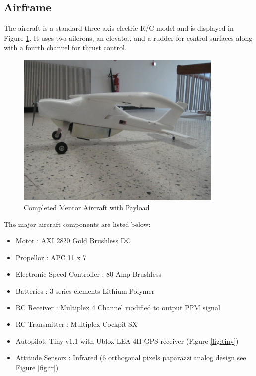 \documentclass[a4paper,11pt]{report}
\begin{document}
\subsection{Airframe}

The aircraft is a standard three-axis electric R/C model and is displayed in Figure \ref{fig:mentor}. It uses two ailerons, an elevator, and a rudder for control surfaces along with a fourth channel for thrust control.

\begin{figure}[ht]
 \centering
 \includegraphics[width=10cm]{800px-Mentor1_2.jpg}
 \caption{Completed Mentor Aircraft with Payload}
 \label{fig:mentor}
\end{figure}

The major aircraft components are listed below:

\begin{itemize}
 \item Motor : AXI 2820 Gold Brushless DC
 \item Propellor : APC 11 x 7 
 \item Electronic Speed Controller : 80 Amp Brushless
 \item Batteries : 3 series elements Lithium Polymer
 \item RC Receiver : Multiplex 4 Channel modified to output PPM signal
 \item RC Transmitter : Multiplex Cockpit SX
 \item Autopilot: Tiny v1.1 with Ublox LEA-4H GPS receiver (Figure \ref{fig:tiny})
 \item Attitude Sensors : Infrared (6 orthogonal pixels paparazzi analog design see Figure \ref{fig:ir})
\end{itemize}
\end{document}
